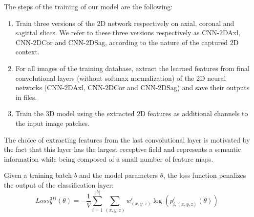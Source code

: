 \documentclass[preprint,12pt]{elsarticle}
\begin{document}
The steps of the training of our model are the following:
\begin{enumerate}
\item Train three versions of the 2D network respectively on axial, coronal and sagittal slices. We refer to these three versions respectively as CNN-2DAxl, CNN-2DCor and CNN-2DSag, according to the nature of the captured 2D context.
\item For all images of the training database, extract the learned features from final convolutional layers (without softmax normalization) of the 2D neural networks (CNN-2DAxl, CNN-2DCor and CNN-2DSag) and save their outputs in files.
\item Train the 3D model using the extracted 2D features as additional channels to the input image patches.
\end{enumerate}


The choice of extracting features from the last convolutional layer is motivated by the fact that this layer has the largest receptive field and represents a semantic information while being composed of a small number of feature maps.


Given a training batch $b$ and the model parameters $\theta$, the loss function penalizes the output of the classification layer:
\begin{equation}
  Loss_{b}^{3D}(\theta)= -\frac{1}{V} \sum_{ i=1}^{|b|} \sum_{ (x,y,z)} w_{ (x,y,z)}^i \log(p^l_{i, (x,y,z)}(\theta))
\end{equation}
\end{document}
